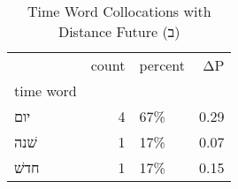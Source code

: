 \begin{table}[htbp!]
\centering
\caption{Time Word Collocations with Distance Future (ב)}
\label{table:distfutב_head_cpd}
\begin{tabular}{lrlr}
\toprule
{} &  count & percent &    ΔP \\
time word &        &         &       \\
\midrule
יום       &      4 &     67\% &  0.29 \\
שׁנה      &      1 &     17\% &  0.07 \\
חדשׁ      &      1 &     17\% &  0.15 \\
\bottomrule
\end{tabular}
\end{table}
